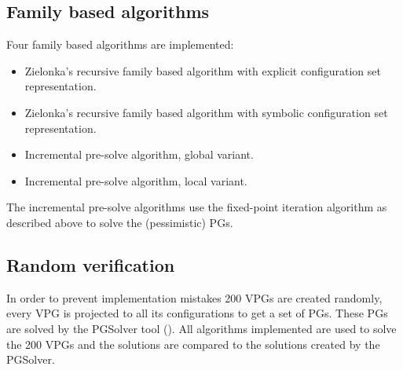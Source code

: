 \subsection{Family based algorithms}
Four family based algorithms are implemented:
\begin{itemize}
	\item Zielonka's recursive family based algorithm with explicit configuration set representation.
	\item Zielonka's recursive family based algorithm with symbolic configuration set representation.
	\item Incremental pre-solve algorithm, global variant.
	\item Incremental pre-solve algorithm, local variant.
\end{itemize}
The incremental pre-solve algorithms use the fixed-point iteration algorithm as described above to solve the (pessimistic) PGs.
\subsection{Random verification}
In order to prevent implementation mistakes 200 VPGs are created randomly, every VPG is projected to all its configurations to get a set of PGs. These PGs are solved by the PGSolver tool (\cite{Friedmann2010ThePC}). All algorithms implemented are used to solve the 200 VPGs and the solutions are compared to the solutions created by the PGSolver.